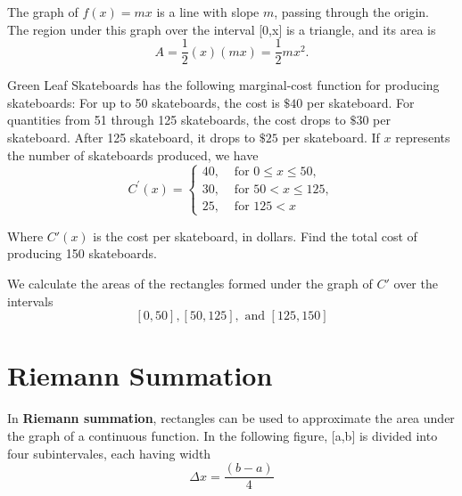 \documentclass{report}
\begin{document}
\begin{figure}[ht]
    \centering
\end{figure}
\begin{minipage}{0.5\textwidth}
  The graph of $f(x) = mx$ is a line with slope $m$, passing through the origin. \\ The region under this graph over the interval [0,x] is a triangle, and its area is
  $$ A = \dfrac{1}{2}(x)(mx) = \dfrac{1}{2}mx^2.$$
\end{minipage}
\hspace{1mm}\begin{minipage}{0.5\textwidth}
\end{minipage}
\begin{figure}[ht]
    \centering
\end{figure}
\vspace{-5em}\begin{mdframed}
\q
Green Leaf Skateboards has the following marginal-cost function for producing skateboards: For up to 50 skateboards, the cost is $\$40$ per skateboard. For quantities from 51 through 125 skateboards, the cost drops to $\$30$ per skateboard. After 125 skateboard, it drops to $\$25$ per skateboard. If $x$ represents the number of skateboards produced, we have
 $$C^{\prime}(x)=\left\{\begin{array}{lc}40, & \text { for } 0 \leq x \leq 50, \\ 30, & \text { for } 50<x \leq 125, \\ 25, & \text { for } 125<x\end{array}\right.$$
 \vspace{1mm}

\noindent Where $C'(x)$ is the cost per skateboard, in dollars. Find the total cost of producing 150 skateboards.
\end{mdframed}
\bigbreak \noindent
\sol We calculate the areas of the rectangles formed under the graph of $C'$ over the intervals 
$$[0,50],[50,125], \text{ and } [125,150]$$
\bigbreak \noindent
\begin{figure}[ht]
  \hspace{17em}    
\end{figure}
\section*{Riemann Summation}
In \textbf{Riemann summation}, rectangles can be used to approximate the area under the graph of a continuous function.
\bigbreak \noindent
In the following figure, [a,b] is divided into four subintervales, each having width
$$ \Delta{x} = \dfrac{(b-a)}{4}$$
\hspace{17em}
\begin{figure}[ht]
    \centering
\end{figure}
\end{document}
